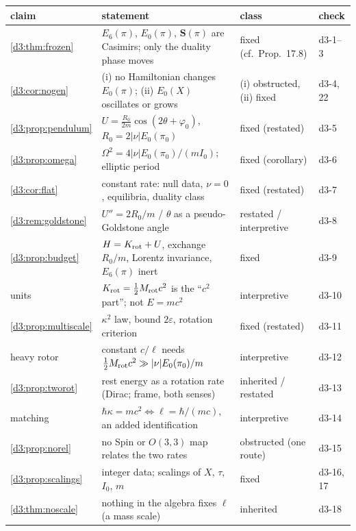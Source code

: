 \begin{table}[t]
\centering
\small
\begin{tabular}{@{}>{\raggedright\arraybackslash}p{2.5cm}>{\raggedright\arraybackslash}p{8.3cm}>{\raggedright\arraybackslash}p{2.8cm}>{\raggedright\arraybackslash}p{1.1cm}@{}}
\toprule
claim & statement & class & check\\
\midrule
\cref{d3:thm:frozen} & $E_6(\pi)$, $E_0(\pi)$, $\mathbf S(\pi)$ are Casimirs; only the duality phase moves & fixed (cf.\ Prop.~17.8) & d3-1--3\\
\cref{d3:cor:nogen} & (i) no Hamiltonian changes $E_0(\pi)$; (ii) $E_0(X)$ oscillates or grows & (i) obstructed, (ii) fixed & d3-4, 22\\
\cref{d3:prop:pendulum} & $U=\tfrac{R_0}{2m}\cos(2\theta+\varphi_0)$, $R_0=2|\nu|E_0(\pi_0)$ & fixed (restated) & d3-5\\
\cref{d3:prop:omega} & $\Omega^2=4|\nu|E_0(\pi_0)/(mI_0)$; elliptic period & fixed (corollary) & d3-6\\
\cref{d3:cor:flat} & constant rate: null data, $\nu=0$, equilibria, duality class & fixed (restated) & d3-7\\
\cref{d3:rem:goldstone} & $U''=2R_0/m$ / $\theta$ as a pseudo-Goldstone angle & restated / interpretive & d3-8\\
\cref{d3:prop:budget} & $H=K_{\rm rot}+U$, exchange $R_0/m$, Lorentz invariance, $E_6(\pi)$ inert & fixed & d3-9\\
units & $K_{\rm rot}=\tfrac12M_{\rm rot}c^2$ is the ``$c^2$ part''; not $E=mc^2$ & interpretive & d3-10\\
\cref{d3:prop:multiscale} & $\kappa^2$ law, bound $2\varepsilon$, rotation criterion & fixed (restated) & d3-11\\
heavy rotor & constant $c/\ell$ needs $\tfrac12M_{\rm rot}c^2\gg|\nu|E_0(\pi_0)/m$ & interpretive & d3-12\\
\cref{d3:prop:tworot} & rest energy as a rotation rate (Dirac; frame, both senses) & inherited / restated & d3-13\\
matching & $\hbar\kappa=mc^2\iff\ell=\hbar/(mc)$, an added identification & interpretive & d3-14\\
\cref{d3:prop:norel} & no Spin or $O(3,3)$ map relates the two rates & obstructed (one route) & d3-15\\
\cref{d3:prop:scalings} & integer data; scalings of $X$, $\tau$, $I_0$, $m$ & fixed & d3-16, 17\\
\cref{d3:thm:noscale} & nothing in the algebra fixes $\ell$ (a mass scale) & inherited & d3-18\\

\end{tabular}
\end{table}
